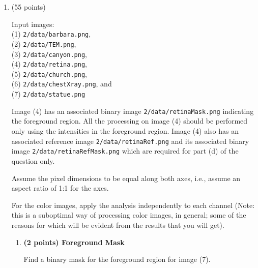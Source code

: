 \documentclass[11pt]{article}
\begin{document}
\begin {enumerate}
\begin {enumerate}
    Redo the previous problem using nearest-neighbor interpolation.
    
    $\bullet$ Write a function \texttt{myNearestNeighborInterpolation.m}  to implement this.
    
    $\bullet$ Display the original and resized images.
    
  \end {enumerate}
  
\item (55 points)
  
  Input images: \\ (1) \texttt{2/data/barbara.png}, \\ (2) \texttt{2/data/TEM.png}, \\ (3) \texttt{2/data/canyon.png}, \\ (4)
  \texttt{2/data/retina.png}, \\ (5) 
  \texttt{2/data/church.png}, \\ (6)
  \texttt{2/data/chestXray.png}, and \\ (7) \texttt{2/data/statue.png}
  
  Image (4) has an associated binary image \texttt{2/data/retinaMask.png} indicating the foreground region. All the processing on image (4)
  should be performed only using the intensities in the foreground region. Image (4) also has an associated reference image
  \texttt{2/data/retinaRef.png} and its associated binary image \texttt{2/data/retinaRefMask.png} which are required for part (d) of the question
  only.
  
  
  
  Assume the pixel dimensions to be equal along both axes, i.e., assume an aspect ratio of 1:1 for the axes.
  
  For the color images, apply the analysis independently to each channel (Note: this is a suboptimal way of processing color images, in general; some of the reasons for which will be evident from the results that you will get).
  
  \begin {enumerate}
  \item \textbf{(2 points) Foreground Mask}
    
    Find a binary mask for the foreground region for image (7).
    

\end{enumerate}
\end{enumerate}
\end{document}
